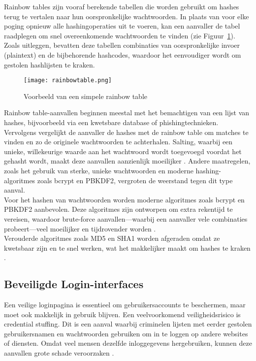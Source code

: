 Rainbow tables zijn vooraf berekende tabellen die worden gebruikt om hashes terug te vertalen naar hun oorspronkelijke wachtwoorden. In plaats van voor elke poging opnieuw alle hashingoperaties uit te voeren, kan een aanvaller de tabel raadplegen om snel overeenkomende wachtwoorden te vinden (zie Figuur~\ref{fig:rainbowtable}). Zoals \textcite{ViniciusFulberGarcia2024} uitleggen, bevatten deze tabellen combinaties van oorspronkelijke invoer (plaintext) en de bijbehorende hashcodes, waardoor het eenvoudiger wordt om gestolen hashlijsten te kraken.\\

\begin{figure}[h]
	\centering
	\texttt{[image: rainbowtable.png]}
	\caption{Voorbeeld van een simpele rainbow table \autocite{ViniciusFulberGarcia2024}}
	\label{fig:rainbowtable}
\end{figure}

Rainbow table-aanvallen beginnen meestal met het bemachtigen van een lijst van hashes, bijvoorbeeld via een kwetsbare database of phishingtechnieken. Vervolgens vergelijkt de aanvaller de hashes met de rainbow table om matches te vinden en zo de originele wachtwoorden te achterhalen. Salting, waarbij een unieke, willekeurige waarde aan het wachtwoord wordt toegevoegd voordat het gehasht wordt, maakt deze aanvallen aanzienlijk moeilijker \textcite{Arias2025}. Andere maatregelen, zoals het gebruik van sterke, unieke wachtwoorden en moderne hashing-algoritmes zoals bcrypt en PBKDF2, vergroten de weerstand tegen dit type aanval.\\

Voor het hashen van wachtwoorden worden moderne algoritmes zoals bcrypt en PBKDF2 aanbevolen. Deze algoritmes zijn ontworpen om extra rekentijd te vereisen, waardoor brute-force aanvallen—waarbij een aanvaller vele combinaties probeert—veel moeilijker en tijdrovender worden \autocite{Gupta2022}.\\

Verouderde algoritmes zoals MD5 en SHA1 worden afgeraden omdat ze kwetsbaar zijn en te snel werken, wat het makkelijker maakt om hashes te kraken \autocite{ReesCarter2024}.

\subsection{Beveiligde Login-interfaces}
Een veilige loginpagina is essentieel om gebruikersaccounts te beschermen, maar moet ook makkelijk in gebruik blijven. Een veelvoorkomend veiligheidsrisico is credential stuffing. Dit is een aanval waarbij criminelen lijsten met eerder gestolen gebruikersnamen en wachtwoorden gebruiken om in te loggen op andere websites of diensten. Omdat veel mensen dezelfde inloggegevens hergebruiken, kunnen deze aanvallen grote schade veroorzaken \autocite{Chinnasamy2025}.\\

